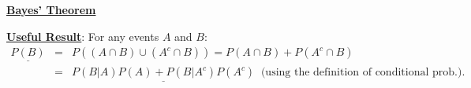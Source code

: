 \documentclass[11pt]{article}
\newcommand{\ub}[1]{{\bf \uline{#1}}}
\begin{document}
%
%


\vspace{0.2in}
\ub{Bayes' Theorem }

\noindent \underline{\bf Useful Result}:  For any events $A$ and $B$: %
\begin{eqnarray*}
\underline{P(B)} & = & P((A\cap B) \cup (A^c\cap B)) = P(A\cap B) + P(A^c\cap B)\\
& = & \underline{P(B|A)P(A) + P(B|A^{c})P(A^{c})} \;\;
{\mbox{(using the definition of conditional  prob.)}}.
\end{eqnarray*}
\end{document}
